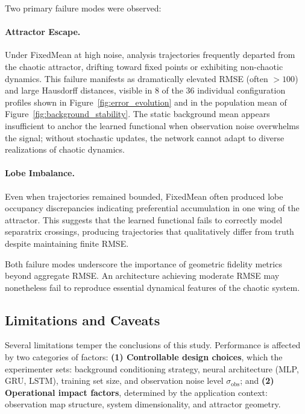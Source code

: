 \documentclass[12pt,a4paper]{article}
\begin{document}
\noindent
Two primary failure modes were observed:

\paragraph{Attractor Escape.} Under FixedMean at high noise, analysis trajectories frequently departed from the chaotic attractor, drifting toward fixed points or exhibiting non-chaotic dynamics. This failure manifests as dramatically elevated RMSE (often $>100$) and large Hausdorff distances, visible in 8 of the 36 individual configuration profiles shown in Figure~\ref{fig:error_evolution} and in the population mean of Figure~\ref{fig:background_stability}. The static background mean appears insufficient to anchor the learned functional when observation noise overwhelms the signal; without stochastic updates, the network cannot adapt to diverse realizations of chaotic dynamics.

\paragraph{Lobe Imbalance.} Even when trajectories remained bounded, FixedMean often produced lobe occupancy discrepancies indicating preferential accumulation in one wing of the attractor. This suggests that the learned functional fails to correctly model separatrix crossings, producing trajectories that qualitatively differ from truth despite maintaining finite RMSE.

\noindent
Both failure modes underscore the importance of geometric fidelity metrics beyond aggregate RMSE. An architecture achieving moderate RMSE may nonetheless fail to reproduce essential dynamical features of the chaotic system.

\subsection{Limitations and Caveats}

\noindent
Several limitations temper the conclusions of this study. Performance is affected by two categories of factors:
\textbf{(1) Controllable design choices}, which the experimenter sets: background conditioning strategy, neural architecture (MLP, GRU, LSTM), training set size, and observation noise level $\sigma_{\text{obs}}$; and
\textbf{(2) Operational impact factors}, determined by the application context: observation map structure, system dimensionality, and attractor geometry.
\end{document}
